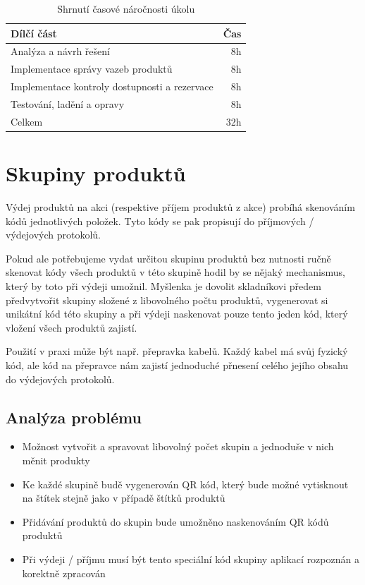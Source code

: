 \begin{table}
	\centering
	\caption[Časová náročnost úkolu na kalkulace]{Shrnutí časové náročnosti úkolu}
	\label{tab:TopLevelTableLabel}
	{
		\begin{tabular}{lr}
			\toprule
			Dílčí část & Čas\\
			\midrule
			Analýza a návrh řešení & 8h \\
			Implementace správy vazeb produktů & 8h \\
            Implementace kontroly dostupnosti a rezervace & 8h \\
            Testování, ladění a opravy & 8h \\
            \midrule
            Celkem  & 32h \\
			\midrule
		\end{tabular}
	}
\end{table}


\section{Skupiny produktů}

Výdej produktů na akci (respektive příjem produktů z akce) probíhá skenováním kódů jednotlivých položek. Tyto kódy se pak propisují do příjmových / výdejových protokolů.

Pokud ale potřebujeme vydat určitou skupinu produktů bez nutnosti ručně skenovat kódy všech produktů v této skupině hodil by se nějaký mechanismus, který by toto při výdeji umožnil. Myšlenka je dovolit skladníkovi předem předvytvořit skupiny složené z libovolného počtu produktů, vygenerovat si unikátní kód této skupiny a při výdeji naskenovat pouze tento jeden kód, který vložení všech produktů zajistí. 

Použití v praxi může být např. přepravka kabelů. Každý kabel má svůj fyzický kód, ale kód na přepravce nám zajistí jednoduché přnesení celého jejího obsahu do výdejových protokolů.

\subsection{Analýza problému}

\begin{itemize}
    \item Možnost vytvořit a spravovat libovolný počet skupin a jednoduše v nich měnit produkty
    \item Ke každé skupině budě vygenerován QR kód, který bude možné vytisknout na štítek stejně jako v případě štítků produktů
    \item Přidávání produktů do skupin bude umožněno naskenováním QR kódů produktů
    \item Při výdeji / příjmu musí být tento speciální kód skupiny aplikací rozpoznán a korektně zpracován
\end{itemize}

